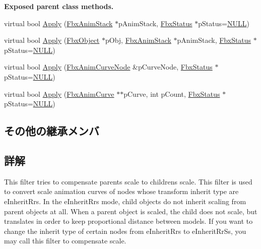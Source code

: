 \begin{Indent}\textbf{ Exposed parent class methods.}\par
\begin{DoxyCompactItemize}
\item 
virtual bool \hyperlink{class_fbx_anim_curve_filter_scale_compensate_a79f0dd5ea9c83ab4fe1088c63c572133}{Apply} (\hyperlink{class_fbx_anim_stack}{Fbx\+Anim\+Stack} $\ast$p\+Anim\+Stack, \hyperlink{class_fbx_status}{Fbx\+Status} $\ast$p\+Status=\hyperlink{fbxarch_8h_a070d2ce7b6bb7e5c05602aa8c308d0c4}{N\+U\+LL})
\item 
virtual bool \hyperlink{class_fbx_anim_curve_filter_scale_compensate_a6ca0f60692ed7e5ea597698807dff89e}{Apply} (\hyperlink{class_fbx_object}{Fbx\+Object} $\ast$p\+Obj, \hyperlink{class_fbx_anim_stack}{Fbx\+Anim\+Stack} $\ast$p\+Anim\+Stack, \hyperlink{class_fbx_status}{Fbx\+Status} $\ast$p\+Status=\hyperlink{fbxarch_8h_a070d2ce7b6bb7e5c05602aa8c308d0c4}{N\+U\+LL})
\item 
virtual bool \hyperlink{class_fbx_anim_curve_filter_scale_compensate_a1e2bc6474043beb0b41a85b2d70fde76}{Apply} (\hyperlink{class_fbx_anim_curve_node}{Fbx\+Anim\+Curve\+Node} \&p\+Curve\+Node, \hyperlink{class_fbx_status}{Fbx\+Status} $\ast$p\+Status=\hyperlink{fbxarch_8h_a070d2ce7b6bb7e5c05602aa8c308d0c4}{N\+U\+LL})
\item 
virtual bool \hyperlink{class_fbx_anim_curve_filter_scale_compensate_a737cb772622029fecb846f3be15ad3fb}{Apply} (\hyperlink{class_fbx_anim_curve}{Fbx\+Anim\+Curve} $\ast$$\ast$p\+Curve, int p\+Count, \hyperlink{class_fbx_status}{Fbx\+Status} $\ast$p\+Status=\hyperlink{fbxarch_8h_a070d2ce7b6bb7e5c05602aa8c308d0c4}{N\+U\+LL})
\end{DoxyCompactItemize}
\end{Indent}
\subsection*{その他の継承メンバ}


\subsection{詳解}
This filter tries to compensate parent\textquotesingle{}s scale to children\textquotesingle{}s scale. This filter is used to convert scale animation curves of nodes whose transform inherit type are e\+Inherit\+Rrs. In the e\+Inherit\+Rrs mode, child objects do not inherit scaling from parent objects at all. When a parent object is scaled, the child does not scale, but translates in order to keep proportional distance between models. If you want to change the inherit type of certain nodes from e\+Inherit\+Rrs to e\+Inherit\+Rr\+Ss, you may call this filter to compensate scale. 

